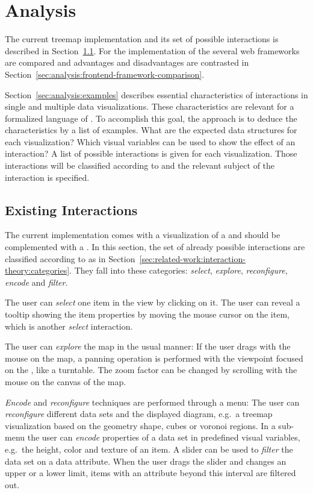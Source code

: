 \chapter{Analysis}\label{sec:analysis}
The current treemap implementation and its set of possible interactions is described in Section~\ref{sec:analysis:existing-interactions}.
For the implementation of the \gv{} several web frameworks are compared and advantages and disadvantages are contrasted in Section~\ref{sec:analysis:frontend-framework-comparison}.

Section~\ref{sec:analysis:examples} describes essential characteristics of interactions in single and multiple data visualizations.
These characteristics are relevant for a formalized language of \cmvs{}.
To accomplish this goal, the approach is to deduce the characteristics by a list of examples.
What are the expected data structures for each visualization?
Which visual variables can be used to show the effect of an interaction?
A list of possible interactions is given for each visualization.
Those interactions will be classified according to \textcite{Yi2007} and the relevant subject of the interaction is specified.



\section{Existing Interactions}\label{sec:analysis:existing-interactions}
The current implementation comes with a visualization of a \tmap{} and should be complemented with a \gv{}.
In this section, the set of already possible interactions are classified according to \textcite{Yi2007} as in Section~\ref{sec:related-work:interaction-theory:categories}.
They fall into these categories: \emph{select}, \emph{explore}, \emph{reconfigure}, \emph{encode} and \emph{filter}.

The user can \emph{select} one item in the view by clicking on it.
The user can reveal a tooltip showing the item properties by moving the mouse cursor on the item, which is another \emph{select} interaction.

The user can \emph{explore} the map in the usual manner:
If the user drags with the mouse on the map, a panning operation is performed with the viewpoint focused on the \tmap{}, like a turntable.
The zoom factor can be changed by scrolling with the mouse on the canvas of the map.

\emph{Encode} and \emph{reconfigure} techniques are performed through a menu:
The user can \emph{reconfigure} different data sets and the displayed diagram, e.g.\ a treemap visualization based on the geometry shape, cubes or voronoi regions.
In a sub-menu the user can \emph{encode} properties of a data set in predefined visual variables, e.g.\ the height, color and texture of an item.
A slider can be used to \emph{filter} the data set on a data attribute.
When the user drags the slider and changes an upper or a lower limit, items with an attribute beyond this interval are filtered out.



